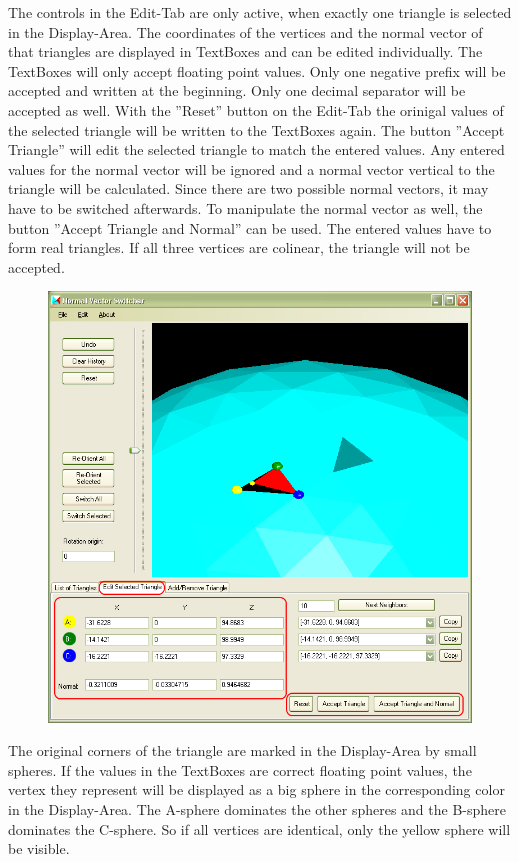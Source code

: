 The controls in the Edit-Tab are only active, when exactly one triangle is selected in the Display-Area. The coordinates of the vertices and the normal vector of that triangles are displayed in TextBoxes and can be edited individually. The TextBoxes will only accept floating point values. Only one negative prefix will be accepted and written at the beginning. Only one decimal separator will be accepted as well. With the ''Reset'' button on the Edit-Tab the orinigal values of the selected triangle will be written to the TextBoxes again. The button ''Accept Triangle'' will edit the selected triangle to match the entered values. Any entered values for the normal vector will be ignored and a normal vector vertical to the triangle will be calculated. Since there are two possible normal vectors, it may have to be switched afterwards. To manipulate the normal vector as well, the button ''Accept Triangle and Normal'' can be used. The entered values have to form real triangles. If all three vertices are colinear, the triangle will not be accepted. 

\begin{figure}[htb]
	\centering
	\includegraphics[width=0.8\linewidth]{window6}
\end{figure}

\noindent
The original corners of the triangle are marked in the Display-Area by small spheres. If the values in the TextBoxes are correct floating point values, the vertex they represent will be displayed as a big sphere in the corresponding color in the Display-Area. The A-sphere dominates the other spheres and the B-sphere dominates the C-sphere. So if all vertices are identical, only the yellow sphere will be visible.

